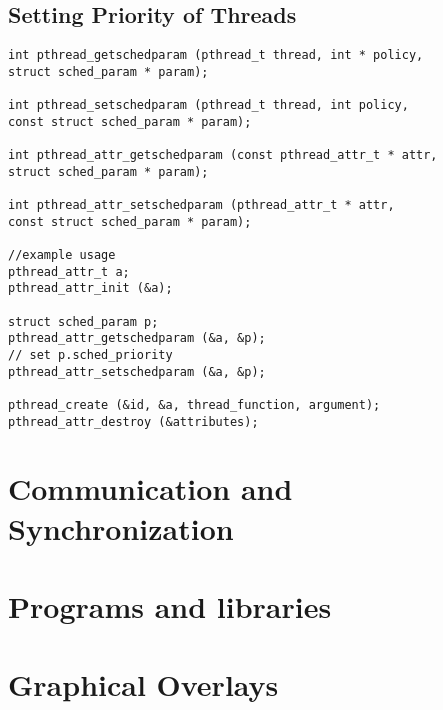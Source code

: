 \documentclass[main.tex,fontsize=8pt,paper=a4,paper=portrait,DIV=calc,]{scrartcl}
\begin{document}
\subsection{Setting Priority of Threads}
\begin{lstlisting}
int pthread_getschedparam (pthread_t thread, int * policy,
struct sched_param * param);

int pthread_setschedparam (pthread_t thread, int policy,
const struct sched_param * param);

int pthread_attr_getschedparam (const pthread_attr_t * attr,
struct sched_param * param);

int pthread_attr_setschedparam (pthread_attr_t * attr,
const struct sched_param * param);

//example usage
pthread_attr_t a;
pthread_attr_init (&a);

struct sched_param p;
pthread_attr_getschedparam (&a, &p);
// set p.sched_priority
pthread_attr_setschedparam (&a, &p);

pthread_create (&id, &a, thread_function, argument);
pthread_attr_destroy (&attributes);
\end{lstlisting}

\section{Communication and Synchronization}

\section{Programs and libraries}

\section{Graphical Overlays}
\end{document}
